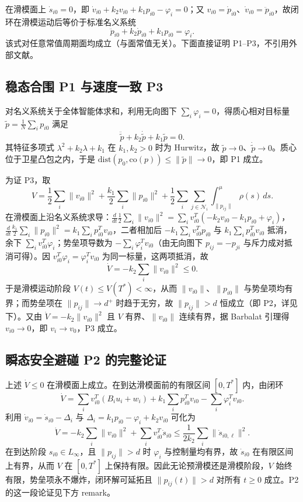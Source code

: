 在滑模面上 $\dot s_{i0}=0$，即 $\dot v_{i0}+k_2v_{i0}+k_1p_{i0}-\varphi_i=0$；又 $v_{i0}=\dot p_{i0}$、$\dot v_{i0}=\ddot p_{i0}$，故闭环在滑模运动后等价于标准名义系统
\[
    \ddot p_{i0}+k_2\dot p_{i0}+k_1p_{i0}=\varphi_i.
\]
该式对任意常值周期面均成立（与面常值无关）。下面直接证明 P1–P3，不引用外部文献。

\subsection{稳态合围 P1 与速度一致 P3}

对名义系统关于全体智能体求和，利用无向图下 $\sum_i\varphi_i=0$，得质心相对目标量 $\tilde p=\frac1N\sum_i p_{i0}$ 满足
\[
    \ddot{\tilde p}+k_2\dot{\tilde p}+k_1\tilde p=0.
\]
其特征多项式 $\lambda^2+k_2\lambda+k_1$ 在 $k_1,k_2>0$ 时为 Hurwitz，故 $\tilde p\to0$、$\dot{\tilde p}\to0$。质心位于卫星凸包之内，于是 $\mathrm{dist}(p_0,\mathrm{co}(p))\le\|\tilde p\|\to0$，即 P1 成立。

为证 P3，取
\[
    V=\frac12\sum_i\|v_{i0}\|^2+\frac{k_1}{2}\sum_i\|p_{i0}\|^2
    +\frac12\sum_i\sum_{j\in\mathcal N_i}\int_{\|p_{ij}\|}^{\mu}\rho(s)\,ds .
\]
在滑模面上沿名义系统求导：$\frac{d}{dt}\frac12\sum_i\|v_{i0}\|^2=\sum_i v_{i0}^T(-k_2v_{i0}-k_1p_{i0}+\varphi_i)$，$\frac{d}{dt}\frac{k_1}{2}\sum_i\|p_{i0}\|^2=k_1\sum_i p_{i0}^Tv_{i0}$，二者相加后 $-k_1\sum_i v_{i0}^Tp_{i0}$ 与 $k_1\sum_i p_{i0}^Tv_{i0}$ 抵消，余下 $\sum_i v_{i0}^T\varphi_i$；势垒项导数为 $-\sum_i\varphi_i^Tv_{i0}$（由无向图下 $p_{ij}=-p_{ji}$ 与斥力成对抵消可得）。因 $v_{i0}^T\varphi_i=\varphi_i^Tv_{i0}$ 为同一标量，这两项抵消，故
\[
    \dot V=-k_2\sum_i\|v_{i0}\|^2\le0.
\]
于是滑模运动阶段 $V(t)\le V(T^*)<\infty$，从而 $\|v_{i0}\|$、$\|p_{i0}\|$ 与势垒项均有界；而势垒项在 $\|p_{ij}\|\to d^+$ 时趋于无穷，故 $\|p_{ij}\|>d$ 恒成立（即 P2，详见下）。又由 $\dot V=-k_2\|v_{i0}\|^2$ 且 $V$ 有界、$\|v_{i0}\|$ 连续有界，据 Barbalat 引理得 $v_{i0}\to0$，即 $v_i\to v_0$，P3 成立。

\subsection{瞬态安全避碰 P2 的完整论证}

上述 $\dot V\le0$ 在滑模面上成立。在到达滑模面前的有限区间 $[0,T^*]$ 内，由闭环
\[
    \dot V=\sum_i v_{i0}^T(B_iu_i+w_i)+k_1\sum_i p_{i0}^Tv_{i0}-\sum_i\varphi_i^Tv_{i0}.
\]
利用 $\dot v_{i0}=\dot s_{i0}-\Delta_i$ 与 $\Delta_i=k_1p_{i0}-\varphi_i+k_2v_{i0}$ 可化为
\[
    \dot V=-k_2\sum_i\|v_{i0}\|^2+\sum_i v_{i0}^T\dot s_{i0}
    \le\frac{1}{2k_2}\sum_i\|\dot s_{i0,\ell}\|^2 .
\]
在到达阶段 $s_{i0}\in L_\infty$，且 $\|p_{ij}\|>d$ 时 $\varphi_i$ 与控制量均有界，故 $\dot s_{i0}$ 在有限区间上有界，从而 $V$ 在 $[0,T^*]$ 上保持有限。因此无论预滑模还是滑模阶段，$V$ 始终有限，势垒项永不爆炸，闭环解可延拓且 $\|p_{ij}(t)\|>d$ 对所有 $t\ge0$ 成立。P2 的这一段论证见下方 remark。

